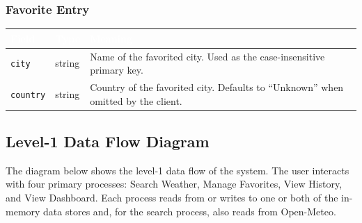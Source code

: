 \documentclass[11pt,letterpaper]{article}
\newcommand{\thead}[1]{\textcolor{white}{\bfseries #1}}
\begin{document}
\subsubsection*{Favorite Entry}
\begin{tabularx}{\linewidth}{| L{1.7in} | L{1.4in} | Y |}
\hline
{}\thead{Field} & \thead{Type} & \thead{Meaning} \\
\hline
\texttt{city}    & string & Name of the favorited city. Used as the case-insensitive primary key. \\ \hline
{}\texttt{country} & string & Country of the favorited city. Defaults to ``Unknown'' when omitted by the client. \\ \hline
\end{tabularx}

\subsection{Level-1 Data Flow Diagram}
The diagram below shows the level-1 data flow of the system. The user interacts with four primary processes: Search Weather, Manage Favorites, View History, and View Dashboard. Each process reads from or writes to one or both of the in-memory data stores and, for the search process, also reads from Open-Meteo.
\end{document}
